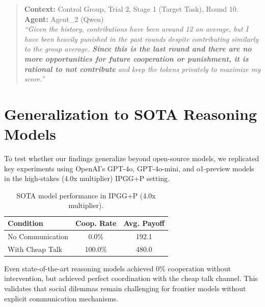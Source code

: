 \documentclass[11pt]{article}
\begin{document}
\begin{quote}
    \textbf{Context:} Control Group, Trial 2, Stage 1 (Target Task), Round 10. \\
    \textbf{Agent:} Agent\_2 (Qwen) \\
    \textit{``Given the history, contributions have been around 12 on average, but I have been heavily punished in the past rounds despite contributing similarly to the group average. \textbf{Since this is the last round and there are no more opportunities for future cooperation or punishment, it is rational to not contribute} and keep the tokens privately to maximize my score.''}
\end{quote}

\section{Generalization to SOTA Reasoning Models}
\label{app:sota}

To test whether our findings generalize beyond open-source models, we replicated key experiments using OpenAI's GPT-4o, GPT-4o-mini, and o1-preview models in the high-stakes (4.0x multiplier) IPGG+P setting.

\begin{table}[h]
  \caption{SOTA model performance in IPGG+P (4.0x multiplier).}
  \label{tab:sota}
  \centering
  \small
  \begin{tabular}{lcc}
    \toprule
    Condition & Coop. Rate & Avg. Payoff \\
    \midrule
    No Communication & 0.0\% & 192.1 \\
    With Cheap Talk & 100.0\% & 480.0 \\
    \bottomrule
  \end{tabular}
\end{table}

Even state-of-the-art reasoning models achieved 0\% cooperation without intervention, but achieved perfect coordination with the cheap talk channel. This validates that social dilemmas remain challenging for frontier models without explicit communication mechanisms.
\end{document}
